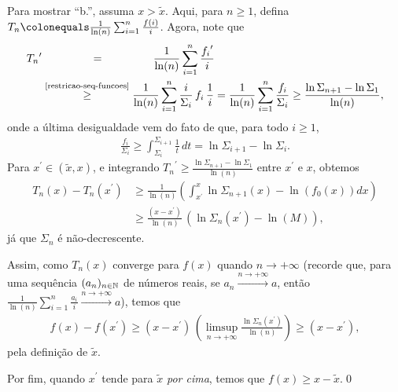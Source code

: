 \par Para mostrar ``b.'', assuma $x > \tilde{x}$. Aqui, para $n \geq 1$, defina $T_n \colonequals \frac{1}{\ln(n)}\sum_{i = 1}^{n}\frac{f(i)}{i}$. Agora, note que 
\begin{align*}
	{T_n}^{\prime} &\overset{\phantom{\eqref{restricao-seq-funcoes}}}{=} \frac{1}{\ln(n)}\sum_{i = 1}^{n}\frac{{f_i}^{\prime}}{i} \\
	&\overset{\text{\eqref{restricao-seq-funcoes}}}{\geq} \frac{1}{\ln(n)}\sum_{i = 1}^{n}\frac{i}{\Sigma_i} \, f_i \, \frac{1}{i} = \frac{1}{\ln(n)}\sum_{i = 1}^{n} \frac{f_i}{\Sigma_i} \geq \frac{\ln\Sigma_{n+1} - \ln\Sigma_1}{\ln(n)},
\end{align*}
onde a última desigualdade vem do fato de que, para todo $i \geq 1$,
\begin{align*}
\frac{f_i}{\Sigma_i} \geq \int_{\Sigma_i}^{\Sigma_{i+1}} \frac{1}{t} \, dt = \ln\Sigma_{i+1} - \ln\Sigma_i.
\end{align*}
Para $x^{\prime} \in (\tilde{x}, x)$, e integrando ${T_n}^{\prime} \geq \frac{\ln\Sigma_{n+1} - \ln\Sigma_1}{\ln(n)}$ entre $x^{\prime}$ e $x$, obtemos
\begin{align*}
	T_n(x) - T_n(x^{\prime}) &\geq \frac{1}{\ln(n)} \left(\int_{x^\prime}^{x} \ln\Sigma_{n+1}(x) - \ln(f_0(x)) dx\right) \\
	&\geq \frac{(x - x^{\prime})}{\ln(n)} \, \left(\ln\Sigma_n(x^\prime) - \ln(M)\right), 
\end{align*}
já que $\Sigma_n$ é não-decrescente.

\par Assim, como $T_n(x)$ converge para $f(x)$ quando $n \to +\infty$ (recorde que, para uma sequência $(a_n)_{n \in \operatorname{\mathbb{N}}}$ de números reais, \hspace{-1pt}se $a_n \overset{n \to +\infty}{\longrightarrow} a$, então $\frac{1}{\ln(n)}\sum_{i = 1}^{n}\frac{a_i}{i} \overset{n \to +\infty}{\longrightarrow} a$), temos que
\begin{align*}
	f(x) - f(x^\prime) \geq (x - x^{\prime}) \, \left(\limsup_{n \rightarrow +\infty} \frac{\ln\Sigma_n(x^{\prime})}{\ln(n)}\right) \geq (x - x^\prime),
\end{align*}
pela definição de $\tilde{x}$.

\par Por fim, quando $x^{\prime}$ tende para $\tilde{x}$ \textit{por cima}, temos que $f(x) \geq x - \tilde{x}$.\hspace{\fill}\qed

\vspace{6pt}


